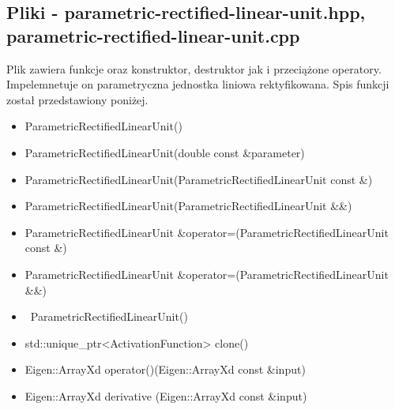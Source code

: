 \documentclass{classrep}
\begin{document}
{        \subsection{Pliki - parametric-rectified-linear-unit.hpp, parametric-rectified-linear-unit.cpp}
        {
            Plik zawiera funkcje oraz konstruktor, destruktor jak i przeciążone operatory.
            Impelemnetuje on parametryczna jednostka liniowa rektyfikowana.
            Spis funkcji został przedstawiony poniżej.
            \begin{itemize}
                \item ParametricRectifiedLinearUnit()
                \item ParametricRectifiedLinearUnit(double const \&parameter)
                \item ParametricRectifiedLinearUnit(ParametricRectifiedLinearUnit const \&)
                \item ParametricRectifiedLinearUnit(ParametricRectifiedLinearUnit \&\&)
                \item ParametricRectifiedLinearUnit \&operator=(ParametricRectifiedLinearUnit const \&)
                \item ParametricRectifiedLinearUnit \&operator=(ParametricRectifiedLinearUnit \&\&)
                \item ~ParametricRectifiedLinearUnit()
                \item std::unique\_ptr<ActivationFunction> clone()
                \item Eigen::ArrayXd operator()(Eigen::ArrayXd const \&input)
                \item Eigen::ArrayXd derivative (Eigen::ArrayXd const \&input)
            \end{itemize}
        }

}
\end{document}
